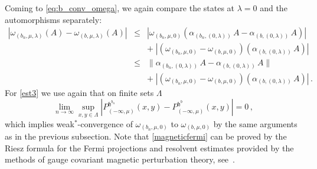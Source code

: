 \documentclass[a4paper]{article}
\newcommand{\w}{\omega}
\theoremstyle{plain}
\theoremstyle{definition}
\theoremstyle{remark}
\renewcommand{\(}{\left(}
\renewcommand{\)}{\right)}
\begin{document}
Coming to \ref{eq:b_conv_omega}, we again compare the states at $\lambda=0$ and the automorphisms separately:
\begin{eqnarray}
        |\w_{(b_n,\mu,\lambda)}(A)-\w_{(b,\mu,\lambda)}(A)|
        &\leq& 
        |\w_{(b_n,\mu,0)}\left( \alpha_{(b_n,(0,\lambda))} \,A- \alpha_{(b,(0,\lambda))}\,A\right)| \nonumber\\
        &&+\;|\left( \w_{(b_n,\mu,0)}-\w_{(b,\mu,0)}\right)(\alpha_{(b,(0,\lambda))}\, A) |
        \nonumber\\
        &\leq& \| \alpha_{(b_n,(0,\lambda))}\,A -\alpha_{(b,(0,\lambda))}\,A\|\label{est4}\\
        &&+\;|\left( \w_{(b_n,\mu,0)}-\w_{(b,\mu,0)}\right)(\alpha_{(b,(0,\lambda))}\,A) |\,. \label{est3}
    \end{eqnarray}
For \eqref{est3} we use again that on finite sets $\Lambda$ 
\begin{equation}\label{magneticfermi}
\lim_{n\to\infty} \sup_{x,y\in\Lambda} \left|P_{(-\infty,\mu)}^{\mathfrak{h}^{b_n}}(x,y) - P_{(-\infty,\mu)}^{\mathfrak{h}^b}(x,y)\right| =0\,,
\end{equation}
which implies weak$^*$-convergence of $\w_{(b_n,\mu,0)}$ to $\w_{(b,\mu,0)}$ by the same arguments as in the previous subsection.
Note that \eqref{magneticfermi} can be proved by the Riesz formula for the Fermi projections and resolvent estimates provided by the methods of gauge covariant magnetic perturbation theory, see~\cite{nenciu2006smoothness, cornean2010lipschitz, cornean2019magnetic}. 
\end{document}
